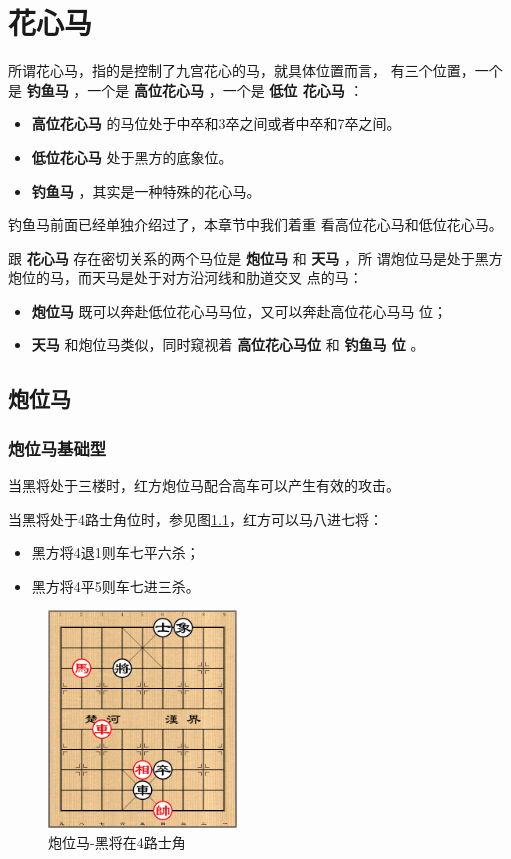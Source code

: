 \documentclass[a5paper,twoside]{book}
\begin{document}
\chapter{花心马}
\label{sec-5}
所谓花心马，指的是控制了九宫花心的马，就具体位置而言，
有三个位置，一个是 \textbf{钓鱼马} ，一个是 \textbf{高位花心马} ，一个是 \textbf{低位
花心马} ：
\begin{itemize}
\item \textbf{高位花心马} 的马位处于中卒和3卒之间或者中卒和7卒之间。
\item \textbf{低位花心马} 处于黑方的底象位。
\item \textbf{钓鱼马} ，其实是一种特殊的花心马。
\end{itemize}


钓鱼马前面已经单独介绍过了，本章节中我们着重
看高位花心马和低位花心马。

跟 \textbf{花心马} 存在密切关系的两个马位是 \textbf{炮位马} 和 \textbf{天马} ，所
谓炮位马是处于黑方炮位的马，而天马是处于对方沿河线和肋道交叉
点的马：
\begin{itemize}
\item \textbf{炮位马} 既可以奔赴低位花心马马位，又可以奔赴高位花心马马
位；
\item \textbf{天马} 和炮位马类似，同时窥视着 \textbf{高位花心马位} 和 \textbf{钓鱼马
位} 。
\end{itemize}
\section{炮位马}
\label{sec-5-1}
\subsection{炮位马基础型}
\label{sec-5-1-1}

当黑将处于三楼时，红方炮位马配合高车可以产生有效的攻击。

当黑将处于4路士角位时，参见图\ref{pwm-hjz4lsj}，红方可以马八进七将：
\begin{itemize}
\item 黑方将4退1则车七平六杀；
\item 黑方将4平5则车七进三杀。
\end{itemize}

\begin{figure}[H]
\centering
\includegraphics[width=5cm]{pic/炮位马-黑将在4路士角.png}
\caption{\label{pwm-hjz4lsj}炮位马-黑将在4路士角}
\end{figure}
\end{document}
